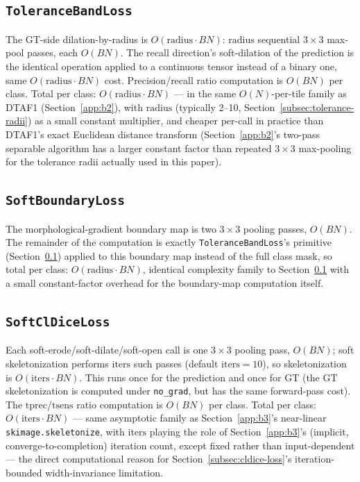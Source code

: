 \subsection{\texttt{ToleranceBandLoss}}
\label{app:b8}
The GT-side dilation-by-radius is $O(\mathrm{radius} \cdot B N)$: $\mathrm{radius}$ sequential
$3\times3$ max-pool passes, each $O(BN)$. The recall direction's soft-dilation of the prediction is
the identical operation applied to a continuous tensor instead of a binary one, same
$O(\mathrm{radius} \cdot BN)$ cost. Precision/recall ratio computation is $O(BN)$ per class. Total
per class: $O(\mathrm{radius} \cdot BN)$ --- in the same $O(N)$-per-tile family as DTAF1
(Section~\ref{app:b2}), with $\mathrm{radius}$ (typically 2--10, Section~\ref{subsec:tolerance-radii})
as a small constant multiplier, and cheaper per-call in practice than DTAF1's exact Euclidean
distance transform (Section~\ref{app:b2}'s two-pass separable algorithm has a larger constant
factor than repeated $3\times3$ max-pooling for the tolerance radii actually used in this paper).

\subsection{\texttt{SoftBoundaryLoss}}
\label{app:b9}
The morphological-gradient boundary map is two $3\times3$ pooling passes, $O(BN)$. The remainder
of the computation is exactly \texttt{ToleranceBandLoss}'s primitive (Section~\ref{app:b8})
applied to this boundary map instead of the full class mask, so total per class:
$O(\mathrm{radius} \cdot BN)$, identical complexity family to Section~\ref{app:b8} with a small
constant-factor overhead for the boundary-map computation itself.

\subsection{\texttt{SoftClDiceLoss}}
\label{app:b10}
Each soft-erode/soft-dilate/soft-open call is one $3\times3$ pooling pass, $O(BN)$; soft
skeletonization performs $\mathrm{iters}$ such passes (default $\mathrm{iters}=10$), so
skeletonization is $O(\mathrm{iters} \cdot BN)$. This runs once for the prediction and once for GT
(the GT skeletonization is computed under \texttt{no\_grad}, but has the same forward-pass cost).
The $\mathrm{tprec}$/$\mathrm{tsens}$ ratio computation is $O(BN)$ per class. Total per class:
$O(\mathrm{iters} \cdot BN)$ --- same asymptotic family as Section~\ref{app:b3}'s near-linear
\texttt{skimage.skeletonize}, with $\mathrm{iters}$ playing the role of Section~\ref{app:b3}'s
(implicit, converge-to-completion) iteration count, except fixed rather than input-dependent ---
the direct computational reason for Section~\ref{subsec:cldice-loss}'s iteration-bounded
width-invariance limitation.


